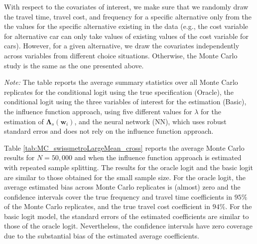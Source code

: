 \documentclass[a4paper, 12pt]{article}
\begin{document}
With respect to the covariates of interest, we make sure that we randomly draw the travel time, travel cost, and frequency for a specific alternative only from the the values for the specific alternative existing in the data (e.g., the cost variable for alternative car can only take values of existing values of the cost variable for cars). However, for a given alternative, we draw the covariates independently across variables from different choice situations.
Otherwise, the Monte Carlo study is the same as the one presented above.\\ 
\begin{table}[b!]
\centering
\captionsetup{justification=centering}
	\caption{Average Summary Statistics of 1000 Monte Carlo Replicates for Large Data and Repeated Sample Splitting with $R=5$}
	\label{tab:MC_swissmetroLargeMean_cross}
	\small

 \begin{minipage}{0.827\textwidth} %
		{   \footnotesize \begin{singlespace}
\textit{Note:}		The table reports the average summary statistics over all Monte Carlo replicates for the conditional logit using the true specification (Oracle), the conditional logit using the three variables of interest for the estimation (Basic),  the influence function approach, using five different values for $\lambda$ for the estimation of  $\bm{\Lambda}_s(\bm{w}_i)$, and the neural network (NN), which uses robust standard erros and does not rely on the influence function approach.
			\end{singlespace}
			\par}
	\end{minipage}
\end{table}

Table \ref{tab:MC_swissmetroLargeMean_cross} reports the average Monte Carlo results for $N=50,000$ and when the influence function approach is estimated with repeated sample splitting. 
The results for the oracle logit and the basic logit are similar to those obtained for the small sample size. For the oracle logit, the average estimated bias across Monte Carlo replicates is (almost) zero and the confidence intervals cover the true frequency and travel time coefficients in $95\%$ of the Monte Carlo replicates, and the true travel cost coefficient in $94\%$. For the basic logit model, the standard errors of the estimated coefficients are  similar to those of the oracle logit. Nevertheless, the confidence intervals have zero coverage due to the substantial bias of the estimated average coefficients. 
\end{document}
